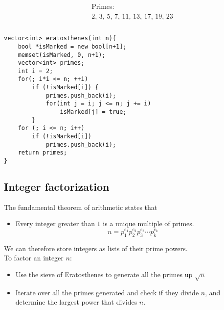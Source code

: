\documentclass[12pt,t]{beamer}
\newcommand{\bi}{\begin{itemize}}
\newcommand{\ei}{\end{itemize}}
\begin{document}
\begin{frame}[fragile]
\begin{columns}[T]
\begin{column}{.7\textwidth}
    \end{column}
    \begin{column}{.5\textwidth}
      Primes: \\
      \color{title}
       $2$,
       $3$,
       $5$,
       $7$,
       $11$,
       $13$,
       $17$,
       $19$,
       $23$
    \end{column}
  \end{columns}
\end{frame}

\begin{frame}[fragile]
  \vspace{20pt}
      \begin{verbatim}
vector<int> eratosthenes(int n){
    bool *isMarked = new bool[n+1];
    memset(isMarked, 0, n+1);
    vector<int> primes;
    int i = 2;
    for(; i*i <= n; ++i)
        if (!isMarked[i]) {
            primes.push_back(i);
            for(int j = i; j <= n; j += i)
                isMarked[j] = true;
        }
    for (; i <= n; i++)
        if (!isMarked[i])
            primes.push_back(i);
    return primes;
}
    \end{verbatim}
\end{frame}

\subsection{Integer factorization}

\begin{frame}
  \vspace{10pt}
  The fundamental theorem of arithmetic states that
  \bi
    \item Every integer greater than $1$ is a unique multiple of primes.
    \[
      n = p_1^{e_1}p_2^{e_2}p_3^{e_3}\cdots p_k^{e_k}
    \]
  \ei
  We can therefore store integers as lists of their prime powers. \\
  \vspace{10pt}
  To factor an integer $n$:
  \bi
    \item Use the sieve of Eratosthenes to generate all the primes up
      $\sqrt{n}$
    \item Iterate over all the primes generated and check if they divide $n$,
      and determine the largest power that divides $n$.
  \ei
\end{frame}
\end{document}
